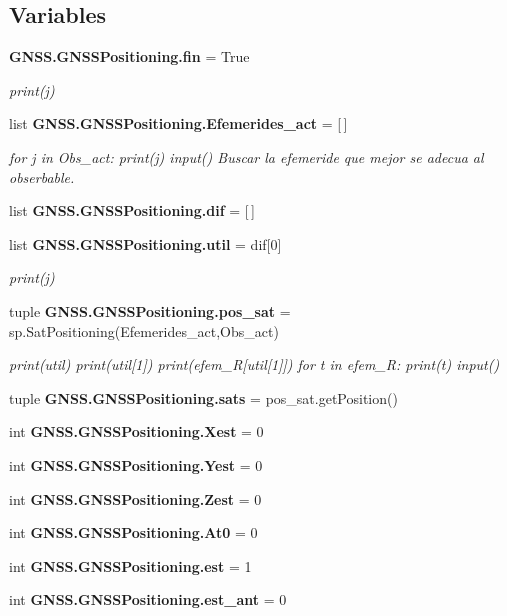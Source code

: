 \subsection*{Variables}
\begin{DoxyCompactItemize}
\item 
{\bf G\-N\-S\-S.\-G\-N\-S\-S\-Positioning.\-fin} = True
\begin{DoxyCompactList}\small\item\em print(j) \end{DoxyCompactList}\item 
list {\bf G\-N\-S\-S.\-G\-N\-S\-S\-Positioning.\-Efemerides\-\_\-act} = [$\,$]
\begin{DoxyCompactList}\small\item\em for j in Obs\-\_\-act\-: print(j) input() Buscar la efemeride que mejor se adecua al obserbable. \end{DoxyCompactList}\item 
list {\bf G\-N\-S\-S.\-G\-N\-S\-S\-Positioning.\-dif} = [$\,$]
\item 
list {\bf G\-N\-S\-S.\-G\-N\-S\-S\-Positioning.\-util} = dif[0]
\begin{DoxyCompactList}\small\item\em print(j) \end{DoxyCompactList}\item 
tuple {\bf G\-N\-S\-S.\-G\-N\-S\-S\-Positioning.\-pos\-\_\-sat} = sp.\-Sat\-Positioning(Efemerides\-\_\-act,Obs\-\_\-act)
\begin{DoxyCompactList}\small\item\em print(util) print(util[1]) print(efem\-\_\-\-R[util[1]]) for t in efem\-\_\-\-R\-: print(t) input() \end{DoxyCompactList}\item 
tuple {\bf G\-N\-S\-S.\-G\-N\-S\-S\-Positioning.\-sats} = pos\-\_\-sat.\-get\-Position()
\item 
int {\bf G\-N\-S\-S.\-G\-N\-S\-S\-Positioning.\-Xest} = 0
\item 
int {\bf G\-N\-S\-S.\-G\-N\-S\-S\-Positioning.\-Yest} = 0
\item 
int {\bf G\-N\-S\-S.\-G\-N\-S\-S\-Positioning.\-Zest} = 0
\item 
int {\bf G\-N\-S\-S.\-G\-N\-S\-S\-Positioning.\-At0} = 0
\item 
int {\bf G\-N\-S\-S.\-G\-N\-S\-S\-Positioning.\-est} = 1
\item 
int {\bf G\-N\-S\-S.\-G\-N\-S\-S\-Positioning.\-est\-\_\-ant} = 0
\item 

\end{DoxyCompactItemize}
